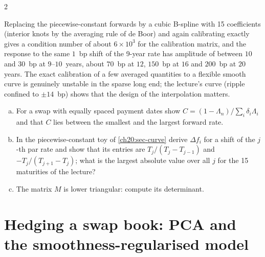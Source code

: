 \begin{paracol}{2}
\begin{remark}
Replacing the piecewise-constant forwards by a cubic B-spline with 15 coefficients (interior knots by the averaging rule of de Boor) and again calibrating exactly
gives a condition number of about $6\times10^3$ for the calibration matrix, and the response to the same $1$~bp shift of the 9-year rate has amplitude of
between $10$ and $30$~bp at $9$--$10$~years, about $70$~bp at $12$, $150$~bp at $16$ and $200$~bp at $20$ years. The exact calibration of a few averaged quantities to a flexible smooth
curve is genuinely unstable in the sparse long end; the lecture's curve (ripple confined to $\pm14$~bp) shows that the design of the interpolation matters.
\end{remark}

\begin{exercise}
\leavevmode
\begin{enumerate}[(a)]
  \item For a swap with equally spaced payment dates show $C=(1-\Lambda_n)/\sum_i\delta_i\Lambda_i$ and that $C$ lies between the smallest and the largest forward rate.
  \item In the piecewise-constant toy of \cref{ch20:sec-curve} derive $\Delta f_i$ for a shift of the $j$-th par rate and show that its entries are $T_j/(T_j-T_{j-1})$ and $-T_j/(T_{j+1}-T_j)$; what is the largest absolute value over all $j$ for the 15 maturities of the lecture?
  \item The matrix $M$ is lower triangular: compute its determinant.
\end{enumerate}
\end{exercise}

\section{Hedging a swap book: PCA and the smoothness-regularised model}\label{ch20:sec-hedge}


\end{paracol}
